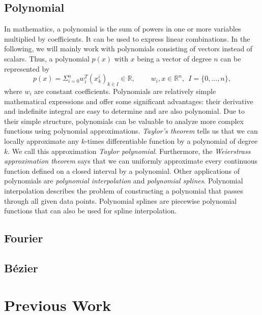 \subsection{Polynomial}
In mathematics, a polynomial is the sum of powers in one or more variables multiplied by coefficients. It can be used to express linear combinations. In the following, we will mainly work with polynomials consisting of vectors instead of scalars. Thus, a polynomial $p(x)$ with $x$ being a vector of degree $n$ can be represented by
\[
  p(x) = \Sigma_{i=0}^{n} w_i^T (x_k^i)_{k \in I} \in \mathbb{R}, \ \ \ \ \ \ \ \ \ \ w_i, x \in \mathbb{R}^n, \ \ I = \{0, ..., n\},
\]
where $w_i$ are constant coefficients. Polynomials are relatively simple mathematical expressions and offer some significant advantages: their derivative and indefinite integral are easy to determine and are also polynomial. Due to their simple structure, polynomials can be valuable to analyze more complex functions using polynomial approximations. \textit{Taylor's theorem} tells us that we can locally approximate any $k$-times differentiable function by a polynomial of degree $k$. We call this approximation \textit{Taylor polynomial}. Furthermore, the \textit{Weierstrass approximation theorem} says that we can uniformly approximate every continuous function defined on a closed interval by a polynomial. Other applications of polynomials are \textit{polynomial interpolation} and \textit{polynomial splines}. Polynomial interpolation describes the problem of constructing a polynomial that passes through all given data points. Polynomial splines are piecewise polynomial functions that can also be used for spline interpolation.


\subsection{Fourier}

\subsection{Bézier}


\section{Previous Work}

